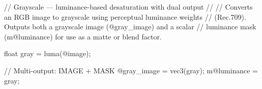 // Grayscale — luminance-based desaturation with dual output
//
// Converts an RGB image to grayscale using perceptual luminance weights
// (Rec.709). Outputs both a grayscale image (@gray_image) and a scalar
// luminance mask (m@luminance) for use as a matte or blend factor.

float gray = luma(@image);

// Multi-output: IMAGE + MASK
@gray_image = vec3(gray);
m@luminance = gray;